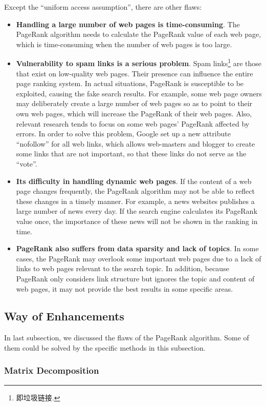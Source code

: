 \documentclass[lettersize,journal,12pt,conference]{IEEEtran}
\begin{document}
Except the ``uniform access assumption'', there are other flaws:
\begin{itemize}
	\item \textbf{Handling a large number of web pages is time-consuming}. The PageRank algorithm needs to calculate the PageRank value of each web page, which is time-consuming when the number of web pages is too large.
	\item \textbf{Vulnerability to spam links is a serious problem}. Spam links\footnote[1]{即垃圾链接.} are those that exist on low-quality web pages. Their presence can influence the entire page ranking system. In actual situations, PageRank is susceptible to be exploited, causing the fake search results. For example, some web page owners may deliberately create a large number of web pages so as to point to their own web pages, which will increase the PageRank of their web pages. Also, relevant research tends to focus on some web pages' PageRank affected by errors. In order to solve this problem, Google set up a new attribute ``nofollow'' for all web links, which allows web-masters and blogger to create some links that are not important, so that these links do not serve as the ``vote''.
	\item \textbf{Its difficulty in handling dynamic web pages}. If the content of a web page changes frequently, the PageRank algorithm may not be able to reflect these changes in a timely manner. For example, a news websites publishes a large number of news every day. If the search engine calculates its PageRank value once, the importance of these news will not be shown in the ranking in time.
	\item \textbf{PageRank also suffers from data sparsity and lack of topics}. In some cases, the PageRank may overlook some important web pages due to a lack of links to web pages relevant to the search topic. In addition, because PageRank only considers link structure but ignores the topic and content of web pages, it may not provide the best results in some specific areas.
\end{itemize}

\subsection{Way of Enhancements}

In last subsection, we discussed the flaws of the PageRank algorithm. Some of them could be solved by the specific methods in this subsection.

\subsubsection{Matrix Decomposition}
\end{document}
